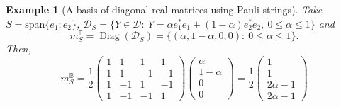 \documentclass[12pt,a4paper]{article}
\def\calD{\mathcal D}
\DeclareMathOperator{\Diag}{Diag}
\newtheorem{example}{Example}
\numberwithin{equation}{section}
\begin{document}
\begin{example} [A basis of diagonal real matrices using Pauli strings]
	Take $S=\text{span}\{e_1;e_2\}$, $\calD_{S}=\{Y\in \calD:\ Y=\alpha e_1^*e_1+(1-\alpha)e_2^*e_2,\ 0\leq \alpha\leq 1\}$ and
	\[m_S^{\mathbb{E}}=\Diag(\calD_{S})=\{(\alpha,1-\alpha,0,0):\ 0\leq \alpha\leq 1\}.\]
	Then, 
	\[m_S^{{\mathbb{B}}}= \frac 12\begin{pmatrix}
		1&1&1&1\\
		1&1&-1&-1\\
		1&-1&1&-1\\
		1&-1&-1&1
	\end{pmatrix}\begin{pmatrix}
	\alpha\\
	1-\alpha\\
	0\\
	0
	\end{pmatrix}=\frac{1}{2}\begin{pmatrix}
	1\\
	1\\
	2\alpha-1\\
	2\alpha-1
	\end{pmatrix}\]
		
\end{example}
\end{document}
